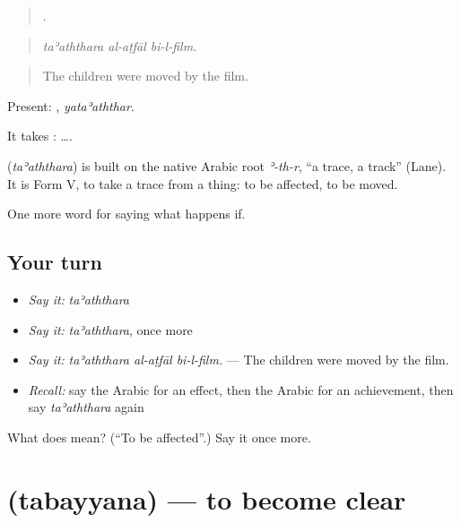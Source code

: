 \begin{quote}
  .
\end{quote}

\begin{quote}
\emph{taʾaththara al-aṭfāl bi-l-film.}
\end{quote}

\begin{quote}
The children were moved by the film.
\end{quote}

Present: , \emph{yataʾaththar}.

It takes :   ….

\begin{cousinweb}
\textbf{} (\emph{taʾaththara}) is built on the native Arabic root \emph{ʾ-th-r}, \textquotedblleft{}a trace, a track\textquotedblright{} (Lane). It is Form V, to take a trace from a thing: to be affected, to be moved.
\end{cousinweb}

\begin{grammarlens}[title={What you've built}]
One more word for saying what happens if.
\end{grammarlens}

\subsection*{Your turn}
\begin{itemize}
\raggedright
  \item \emph{Say it:} \emph{taʾaththara}
  \item \emph{Say it:} \emph{taʾaththara}, once more
  \item \emph{Say it:} \emph{taʾaththara al-aṭfāl bi-l-film.} — The children were moved by the film.
  \item \emph{Recall:} say the Arabic for an effect, then the Arabic for an achievement, then say \emph{taʾaththara} again
\end{itemize}

\begin{tcolorbox}[breakable,colback=teal!4,colframe=teal!35!black,title={Before you move on}]
What does  mean? (\textquotedblleft{}To be affected\textquotedblright{}.) Say it once more.
\end{tcolorbox}
\section[\texorpdfstring{\ar{تبين} (tabayyana)}{تبين (tabayyana)}]{ (tabayyana) — to become clear}

